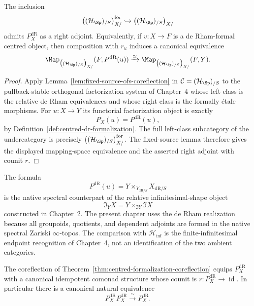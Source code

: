 \begin{theorem}
\label{thm:centred-formalization-coreflection}
The inclusion
\[
    \bigl((\mathcal H_{\Sp})_{/S}\bigr)_{X/}^{\mathrm{for}}
    \hookrightarrow
    \bigl((\mathcal H_{\Sp})_{/S}\bigr)_{X/}
\]
admits $P_X^{\mathrm{dR}}$ as a right adjoint.  Equivalently, if
$v:X\to F$ is a de Rham-formal centred object, then composition with
$r_u$ induces a canonical equivalence
\[
    \Map_{\bigl((\mathcal H_{\Sp})_{/S}\bigr)_{X/}}
    (F,P^{\mathrm{dR}}(u))
    \xrightarrow{\simeq}
    \Map_{\bigl((\mathcal H_{\Sp})_{/S}\bigr)_{X/}}
    (F,Y).
\]
\end{theorem}

\begin{proof}
Apply Lemma~\ref{lem:fixed-source-ofs-coreflection} in
$\mathcal C=(\mathcal H_{\Sp})_{/S}$ to the pullback-stable orthogonal factorization
system of Chapter~4 whose left class is the relative de Rham equivalences and
whose right class is the formally \'etale morphisms.  For
$u:X\to Y$ its functorial factorization object is exactly
\[
    P_X(u)
    =
    P^{\mathrm{dR}}(u),
\]
by Definition~\ref{def:centred-dr-formalization}.  The full left-class
subcategory of the undercategory is precisely
$\bigl((\mathcal H_{\Sp})_{/S}\bigr)_{X/}^{\mathrm{for}}$.  The fixed-source lemma therefore gives the
displayed mapping-space equivalence and the asserted right adjoint with
counit $r$.
\end{proof}

\begin{remark}
The formula
\[
    P^{\mathrm{dR}}(u)
    =
    Y\times_{Y_{\mathrm{dR}/S}}X_{\mathrm{dR}/S}
\]
is the native spectral counterpart of the relative infinitesimal-shape object
\[
    \Im_YX
    =
    Y\times_{\Im Y}\Im X
\]
constructed in Chapter~2.  The present chapter uses the de Rham realization
because all groupoids, quotients, and dependent adjoints are formed in the
native spectral Zariski $\infty$-topos.  The comparison with
$\mathcal H_{\inf}$ is the finite-infinitesimal endpoint recognition
of Chapter~4, not an identification of the two ambient categories.
\end{remark}

\begin{theorem}
\label{thm:centred-formalization-idempotent}
The coreflection of
Theorem~\ref{thm:centred-formalization-coreflection} equips $P_X^{\mathrm{dR}}$ with a
canonical idempotent comonad structure whose counit is
$r:P_X^{\mathrm{dR}}\to\operatorname{id}$.  In particular there is a canonical natural
equivalence
\[
    P_X^{\mathrm{dR}}P_X^{\mathrm{dR}}
    \xrightarrow{\simeq}
    P_X^{\mathrm{dR}}.
\]
\end{theorem}


